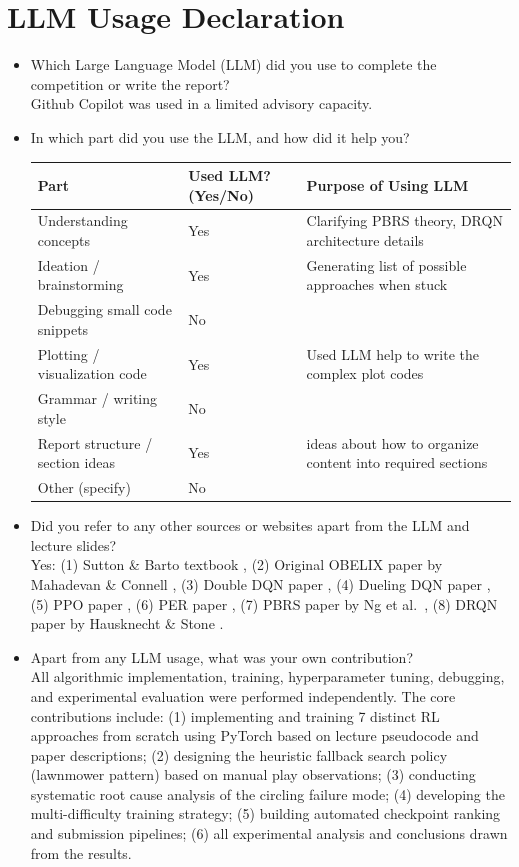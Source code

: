 \documentclass[10.5pt, oneside]{article}
\begin{document}
\section*{LLM Usage Declaration}
\begin{itemize}
\item Which Large Language Model (LLM) did you use to complete the competition or write the report? \\
Github Copilot was used in a limited advisory capacity.

\item In which part did you use the LLM, and how did it help you?

\begin{tabular}{l|l|l}
\toprule
Part & Used LLM? (Yes/No) & Purpose of Using LLM \\
\midrule
Understanding concepts & Yes & Clarifying PBRS theory, DRQN architecture details \\
Ideation / brainstorming & Yes & Generating list of possible approaches when stuck\\
Debugging small code snippets & No &   \\
Plotting / visualization code & Yes & Used LLM help to write the complex plot codes  \\
Grammar / writing style & No & \\
Report structure / section ideas & Yes & ideas about how to organize content into required sections \\
Other (specify) & No &   \\
\bottomrule
\end{tabular}

\item Did you refer to any other sources or websites apart from the LLM and lecture slides? \\
Yes: (1) Sutton \& Barto textbook \cite{sutton2018reinforcement}, (2) Original OBELIX paper by Mahadevan \& Connell \cite{mahadevan1992automatic}, (3) Double DQN paper \cite{van2016deep}, (4) Dueling DQN paper \cite{wang2016dueling}, (5) PPO paper \cite{schulman2017proximal}, (6) PER paper \cite{schaul2015prioritized}, (7) PBRS paper by Ng et al.\ \cite{ng1999policy}, (8) DRQN paper by Hausknecht \& Stone \cite{hausknecht2015deep}.

\item Apart from any LLM usage, what was your own contribution? \\
All algorithmic implementation, training, hyperparameter tuning, debugging, and experimental evaluation were performed independently. The core contributions include: (1) implementing and training 7 distinct RL approaches from scratch using PyTorch based on lecture pseudocode and paper descriptions; (2) designing the heuristic fallback search policy (lawnmower pattern) based on manual play observations; (3) conducting systematic root cause analysis of the circling failure mode; (4) developing the multi-difficulty training strategy; (5) building automated checkpoint ranking and submission pipelines; (6) all experimental analysis and conclusions drawn from the results.
\end{itemize}

\vspace{1cm}



\end{document}
